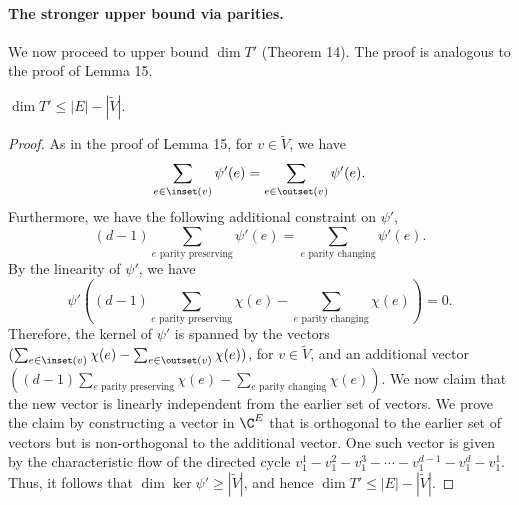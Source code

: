 \paragraph{The stronger upper bound via parities.}
We now proceed to upper bound $\dim T'$ (Theorem 14). The proof is analogous to the proof of Lemma 15.
\begin{theorem}$\dim T'\le|E|-|\widetilde V|$.\end{theorem}
\begin{proof}
As in the proof of Lemma 15, for $v\in\widetilde V$, we have
\[\sum_{e\in\inset(v)}\psi'(e)=\sum_{e\in\outset(v)}\psi'(e).\]
Furthermore, we have the following additional constraint on $\psi'$,
\[(d-1)\sum_{e\text{ parity preserving}}\psi'(e)=\sum_{e\text{ parity changing}}\psi'(e).\]
By the linearity of $\psi'$, we have
\[\psi'\left((d-1)\sum_{e\text{ parity preserving}}\chi(e)-\sum_{e\text{ parity changing}}\chi(e)\right)=0.\]
Therefore, the kernel of $\psi'$ is spanned by the vectors $(\sum_{e\in\inset(v)}\chi(e)-\sum_{e\in\outset(v)}\chi(e))$, for $v\in\widetilde V$, and an additional vector $((d-1)\sum_{e\text{ parity preserving}}\chi(e)-\sum_{e\text{ parity changing}}\chi(e))$.
We now claim that the new vector is linearly independent from the earlier set of vectors. We prove the claim by constructing a vector in $\C^E$ that is orthogonal to the earlier set of vectors but is non-orthogonal to the additional vector. One such vector is given by the characteristic flow of the directed cycle $v^1_1-v^2_1-v^3_1-\cdots-v^{d-1}_1-v^d_1-v^1_1$.
Thus, it follows that $\dim\ker\psi'\ge|\widetilde V|$, and hence $\dim T'\le|E|-|\widetilde V|$.
\end{proof}
